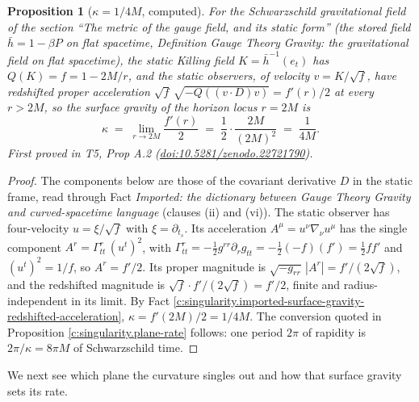 \documentclass[11pt]{article}
\newtheorem{proposition}[theorem]{Proposition}
\theoremstyle{definition}
\theoremstyle{plain}
\providecommand{\hb}{}\renewcommand{\hb}{\bar{h}}
\begin{document}
\begin{proposition}[$\kappa = 1/4M$, computed]\label{c:singularity.computed}
For the Schwarzschild gravitational field of the section ``The metric of the gauge field, and its static form'' (the stored field $\hb = 1 - \beta P$ on flat spacetime, Definition \emph{Gauge Theory Gravity: the gravitational field on flat spacetime}), the static Killing field $K = \hb^{-1}(e_t)$ has $Q(K) = f = 1 - 2M/r$, and the static observers, of velocity $v = K/\sqrt f$, have redshifted proper acceleration $\sqrt f\,\sqrt{-Q((v \cdot D)v)} = f'(r)/2$ at every $r > 2M$, so the surface gravity of the horizon locus $r = 2M$ is
\[
\kappa \;=\; \lim_{r \to 2M} \frac{f'(r)}{2} \;=\; \frac{1}{2}\cdot\frac{2M}{(2M)^2} \;=\; \frac{1}{4M} .
\]
\emph{First proved in} T5, Prop A.2 (\href{https://doi.org/10.5281/zenodo.22721790}{doi:10.5281/zenodo.22721790}).
\end{proposition}
\begin{proof}
The components below are those of the covariant derivative $D$ in the static frame, read through Fact \emph{Imported: the dictionary between Gauge Theory Gravity and curved-spacetime language} (clauses (ii) and (vi)). The static observer has four-velocity $u = \xi/\sqrt f$ with $\xi = \partial_{t_s}$. Its acceleration $A^\mu = u^\nu \nabla_\nu u^\mu$ has the single component $A^r = \Gamma^r_{tt}\,(u^t)^2$, with $\Gamma^r_{tt} = -\tfrac12 g^{rr}\partial_r g_{tt} = -\tfrac12(-f)(f') = \tfrac12 f f'$ and $(u^t)^2 = 1/f$, so $A^r = f'/2$. Its proper magnitude is $\sqrt{-g_{rr}}\,|A^r| = f'/(2\sqrt f)$, and the redshifted magnitude is $\sqrt f \cdot f'/(2\sqrt f) = f'/2$, finite and radius-independent in its limit. By Fact \ref{c:singularity.imported-surface-gravity-redshifted-acceleration}, $\kappa = f'(2M)/2 = 1/4M$. The conversion quoted in Proposition \ref{c:singularity.plane-rate} follows: one period $2\pi$ of rapidity is $2\pi/\kappa = 8\pi M$ of Schwarzschild time.

\end{proof}

We next see which plane the curvature singles out and how that surface gravity sets its rate.
\end{document}
